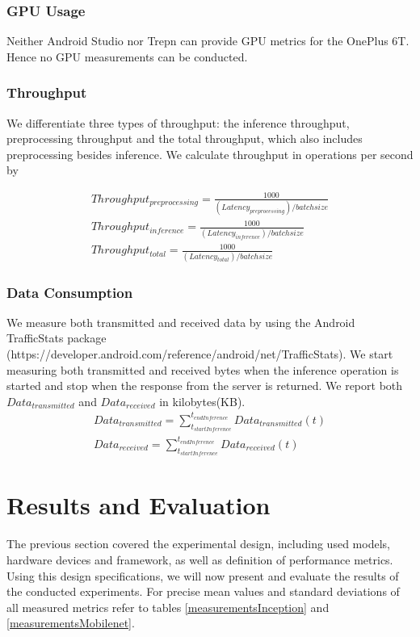 \subsubsection{GPU Usage}
Neither Android Studio nor Trepn can provide GPU metrics for the OnePlus 6T. Hence no GPU measurements can be conducted.
\subsubsection{Throughput}
We differentiate three types of throughput: the inference throughput, preprocessing throughput and the total throughput, which also includes preprocessing besides inference.
We calculate throughput in operations per second by 

\begin{equation*}
\begin{gathered}
Throughput_{preprocessing} =\frac{1000}{(Latency_{preprocessing}) / batchsize}\\
Throughput_{inference} =\frac{1000}{(Latency_{inference}) / batchsize}\\
Throughput_{total}  =\frac{1000}{(Latency_{total}) / batchsize}
\end{gathered}
\end{equation*}
\subsubsection{Data Consumption}
We measure both transmitted and received data by using the Android TrafficStats package (https://developer.android.com/reference/android/net/TrafficStats). We start measuring both transmitted and received bytes when the inference operation is started and stop when the response from the server is returned. We report both $Data_{transmitted}$ and $Data_{received}$ in kilobytes(KB).
\begin{equation*}
\begin{gathered}
Data_{transmitted} = \sum_{t_{startInference}}^{t_{endInference}} Data_{transmitted}(t)\\
Data_{received} = \sum_{t_{startInference}}^{t_{endInference}} Data_{received}(t)
\end{gathered}
\end{equation*}
\section{Results and Evaluation}
The previous section covered the experimental design, including used models, hardware devices and framework, as well as definition of performance metrics. Using this design specifications, we will now present and evaluate the results of the conducted experiments.
For precise mean values and standard deviations of all measured metrics refer to tables \ref{measurementsInception} and \ref{measurementsMobilenet}.

